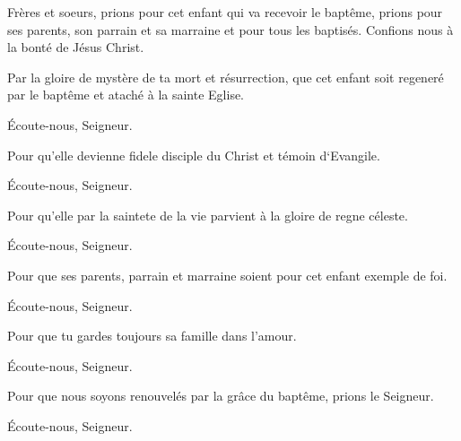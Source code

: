  Frères et soeurs, prions pour cet enfant
qui va recevoir le baptême, prions pour ses parents, son parrain
et sa marraine et pour tous les baptisés. Confions nous à la bonté
de Jésus Christ.

 Par la gloire de mystère de ta mort et résurrection,
que cet enfant soit regeneré par le baptême et ataché à la sainte Eglise.

 Écoute-nous, Seigneur.

 Pour qu'elle devienne fidele disciple du Christ et
témoin d‘Evangile.

 Écoute-nous, Seigneur.

 Pour qu'elle par la saintete de la vie parvient
à la gloire de regne céleste.

 Écoute-nous, Seigneur.

 Pour que ses parents, parrain et marraine soient
pour cet enfant exemple de foi.

 Écoute-nous, Seigneur.

 Pour que tu gardes toujours sa famille dans l’amour.

 Écoute-nous, Seigneur.

 Pour que nous soyons renouvelés par la grâce du
baptême, prions le Seigneur.

 Écoute-nous, Seigneur.
